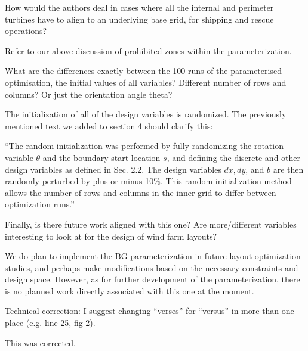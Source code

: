 \documentclass[12pt]{report}
\begin{document}
\color{black}
\bigskip

How would the authors deal in cases where all the internal and perimeter turbines have to align to an underlying base grid, for shipping and rescue operations? 

\bigskip
\color{blue}

Refer to our above discussion of prohibited zones within the parameterization.

\color{black}
\bigskip

What are the differences exactly between the 100 runs of the parameterised optimisation, the initial values of all variables? Different number of rows and columns? Or just the orientation angle theta?

\bigskip
\color{blue}

The initialization of all of the design variables is randomized. The previously mentioned text we added to section 4 should clarify this:

\smallskip
``The random initialization was performed by fully randomizing the rotation variable $\theta$ and the boundary start location $s$, and defining the discrete and other design variables as defined in Sec. 2.2. The design variables $dx, dy$, and $b$ are then randomly perturbed by plus or minus 10\%. This random initialization method allows the number of rows and columns in the inner grid to differ between optimization runs.''

\color{black}
\bigskip

Finally, is there future work aligned with this one? Are more/different variables interesting to look at for the design of wind farm layouts? 

\bigskip
\color{blue}

We do plan to implement the BG parameterization in future layout optimization studies, and perhaps make modifications based on the necessary constraints and design space. However, as for further development of the parameterization, there is no planned work directly associated with this one at the moment.

\color{black}
\bigskip

Technical correction: I suggest changing ``verses'' for ``versus'' in more than one place (e.g. line 25, fig 2).

\bigskip
\color{blue}

This was corrected.
\end{document}
